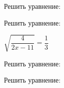 \begin{listofex}
	\item Решить уравнение:
	\begin{enumcols}[itemcolumns=2]
		\item {}
		\item {}
		\item {}
		\item {}
	\end{enumcols}
	\item Решить уравнение:
	\begin{enumcols}[itemcolumns=2]
		\item \( \sqrt{\dfrac{4}{2x-11}}=\dfrac{1}{3} \)
		\item {}
		\item {}
		\item {}
	\end{enumcols}
	\item Решить уравнение:
	\begin{enumcols}[itemcolumns=2]
		\item {}
		\item {}
		\item {}
		\item {}
		\item {}
	\end{enumcols}
	\item Решить уравнение:
	\begin{enumcols}[itemcolumns=2]
		\item {}
		\item {}
		\item {}
		\item {}
	\end{enumcols}
\end{listofex}
